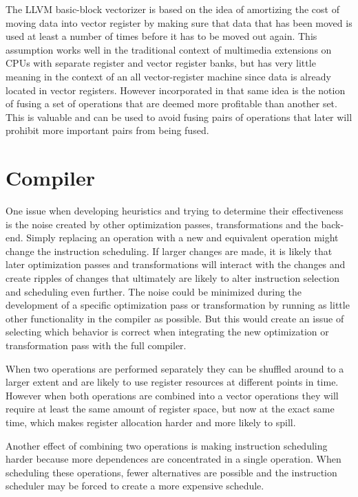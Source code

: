 \documentclass[12pt,a4paper,onecolumn,twoside,openright]{report}
\begin{document}
The LLVM basic-block vectorizer is based on the idea of amortizing the cost of moving data into vector register by making sure that data that has been moved is used at least a number of times before it has to be moved out again. This assumption works well in the traditional context of multimedia extensions on CPUs with separate register and vector register banks, but has very little meaning in the context of an all vector-register machine since data is already located in vector registers. However incorporated in that same idea is the notion of fusing a set of operations that are deemed more profitable than another set. This is valuable and can be used to avoid fusing pairs of operations that later will prohibit more important pairs from being fused.



\section{Compiler}
\label{sec:compiler}
One issue when developing heuristics and trying to determine their effectiveness is the noise created by other optimization passes, transformations and the back-end. Simply replacing an operation with a new and equivalent operation might change the instruction scheduling. If larger changes are made, it is likely that later optimization passes and transformations will interact with the changes and create ripples of changes that ultimately are likely to alter instruction selection and scheduling even further. The noise could be minimized during the development of a specific optimization pass or transformation by running as little other functionality in the compiler as possible. But this would create an issue of selecting which behavior is correct when integrating the new optimization or transformation pass with the full compiler.


When two operations are performed separately they can be shuffled around to a larger extent and are likely to use register resources at different points in time. However when both operations are combined into a vector operations they will require at least the same amount of register space, but now at the exact same time, which makes register allocation harder and more likely to spill.


Another effect of combining two operations is making instruction scheduling harder because more dependences are concentrated in a single operation. When scheduling these operations, fewer alternatives are possible and the instruction scheduler may be forced to create a more expensive schedule. 
\end{document}
